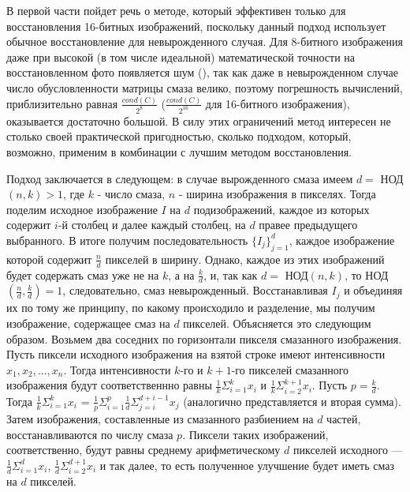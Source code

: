 \documentclass[a4paper]{article}
\theoremstyle{definition}
\begin{document}
    В первой части пойдет речь о методе, который эффективен только для восстановления 16-битных изображений, поскольку данный подход использует обычное восстановление для невырожденного случая. Для 8-битного изображения даже при высокой (в том числе идеальной) математической точности на восстановленном фото появляется шум (\cite{noise}), так как даже в невырожденном случае число обусловленности матрицы смаза велико, поэтому погрешность вычислений, приблизительно равная $\frac{cond(C)}{2^8}$ ($\frac{cond(C)}{2^{16}}$ для 16-битного изображения), оказывается достаточно большой. В силу этих ограничений метод интересен не столько своей практической пригодностью, сколько подходом, который, возможно, применим в комбинации с лучшим методом восстановления.


    Подход заключается в следующем: в случае вырожденного смаза имеем $d =$ НОД$(n, k) > 1$, где $k$ - число смаза, $n$ - ширина изображения в пикселях. Тогда поделим исходное изображение $I$ на $d$ подизображений, каждое из которых содержит $i$-й столбец и далее каждый столбец, на $d$ правее предыдущего выбранного. В итоге получим последовательность $\{I_j\}_{j=1}^{d}$, каждое изображение которой содержит $\frac{n}{d}$ пикселей в ширину. Однако, каждое из этих изображений будет содержать смаз уже не на $k$, а на $\frac{k}{d}$, и, так как $d =$ НОД$(n, k)$, то НОД$(\frac{n}{d}, \frac{k}{d}) = 1$, следовательно, смаз невырожденный. Восстанавливая $I_j$ и объединяя их по тому же принципу, по какому происходило и разделение, мы получим изображение, содержащее смаз на $d$ пикселей. Объясняется это следующим образом. Возьмем два соседних по горизонтали пикселя смазанного изображения. Пусть пиксели исходного изображения на взятой строке имеют интенсивности $x_1, x_2, ..., x_n$. Тогда интенсивности $k$-го и $k+1$-го пикселей смазанного изображения будут соответственнно равны $\frac{1}{k}\Sigma_{i=1}^{k}x_i$ и $\frac{1}{k}\Sigma_{i=2}^{k+1}x_i$. Пусть $p = \frac{k}{d}$. Тогда $\frac{1}{k}\Sigma_{i=1}^{k}x_i$ = $\frac{1}{p}\Sigma_{i=1}^{p}\frac{1}{d}\Sigma_{j=i}^{d+i-1}x_j$ (аналогично представляется и вторая сумма). Затем изображения, составленные из смазанного разбиением на $d$ частей, восстанавливаются по числу смаза $p$. Пиксели таких изображений, соответственно, будут равны среднему арифметическому $d$ пикселей исходного --- $\frac{1}{d}\Sigma_{i=1}^{d}x_i$, $\frac{1}{d}\Sigma_{i=2}^{d+1}x_i$ и так далее, то есть полученное улучшение будет иметь смаз на $d$ пикселей.
\end{document}
